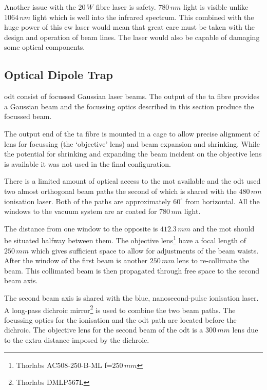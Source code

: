 Another issue with the $20\,\unit{W}$ fibre laser is safety. $780\,\unit{nm}$ light is visible unlike $1064\,\unit{nm}$ light which is well into the infrared spectrum. This combined with the huge power of this \gls{cw} laser would mean that great care must be taken with the design and operation of beam lines. The laser would also be capable of damaging some optical components.


\subsection{Optical Dipole Trap}

\Gls{odt} consist of focussed Gaussian laser beams. The output of the \gls{ta} fibre provides a Gaussian beam and the focussing optics described in this section produce the focussed beam.

The output end of the \gls{ta} fibre is mounted in a cage to allow precise alignment of lens for focussing (the `objective' lens) and beam expansion and shrinking. While the potential for shrinking and expanding the beam incident on the objective lens is available it was not used in the final configuration.

There is a limited amount of optical access to the \gls{mot} available and the \gls{odt} used two almost orthogonal beam paths the second of which is shared with the $480\,\unit{nm}$ ionisation laser. Both of the paths are approximately $60^{\circ}$ from horizontal. All the windows to the vacuum system are \gls{ar} coated for $780\,\unit{nm}$ light.

The distance from one window to the opposite is $412.3\,\unit{mm}$ and the \gls{mot} should be situated halfway between them. The objective lens\footnote{Thorlabs AC508-250-B-ML f=$250\,\unit{mm}$} have a focal length of $250\,\unit{mm}$ which gives sufficient space to allow for adjustments of the beam waists. After the window of the first beam is another $250\,\unit{mm}$ lens to re-collimate the beam. This collimated beam is then propagated through free space to the second beam axis.

The second beam axis is shared with the blue, nanosecond-pulse ionisation laser. A long-pass dichroic mirror\footnote{Thorlabs DMLP567L} is used to combine the two beam paths. The focussing optics for the ionisation and the \gls{odt} path are located before the dichroic. The objective lens for the second beam of the \gls{odt} is a $300\,\unit{mm}$ lens due to the extra distance imposed by the dichroic.


